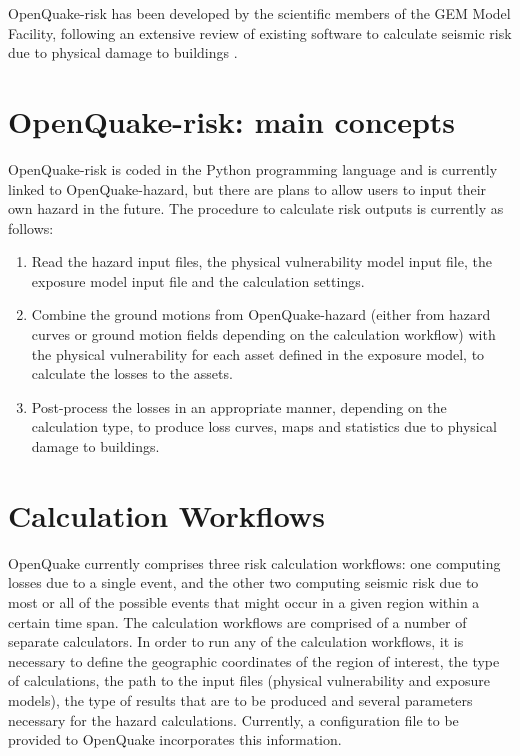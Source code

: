 OpenQuake-risk has been developed by the scientific members of the GEM Model 
Facility, following an extensive review of existing software to calculate 
seismic risk due to physical damage to buildings \citep{crowley2010}. 
%
\section{OpenQuake-risk: main concepts}
OpenQuake-risk is coded in the Python programming language and is currently 
linked to OpenQuake-hazard, but there are plans to allow users to input 
their own hazard in the future. The procedure to calculate risk outputs is 
currently as follows:
\begin{enumerate}

\item Read the hazard input files, the physical vulnerability model input 
file, the exposure model input file and the calculation settings.

\item Combine the ground motions from OpenQuake-hazard (either from hazard 
curves or ground motion fields depending on the calculation workflow) with 
the physical vulnerability for each asset defined in the exposure model, 
to calculate the losses to the assets.

\item Post-process the losses in an appropriate manner, depending on the 
calculation type, to produce loss curves, maps and statistics due to 
physical damage to buildings. 

\end{enumerate}
%
\section{Calculation Workflows}
OpenQuake currently comprises three risk calculation workflows: one 
computing losses due to a single event, and the other two computing seismic
risk due to most or all of the possible events that might occur in a given 
region within a certain time span. The calculation workflows are comprised of a number of separate calculators. In order to run any of the calculation workflows, it is necessary to define the geographic coordinates of the region of interest, the type of calculations, the path to the input files (physical vulnerability and exposure models), the type of results that are to be produced and several parameters necessary for the hazard calculations. Currently, a configuration file to be provided to OpenQuake incorporates this information.

